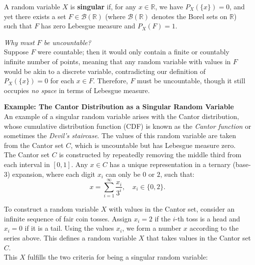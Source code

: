 \begin{definition}
    A random variable \( X \) is \textbf{singular} if, for any \( x \in \mathbb{R} \), we have \( P_X(\{x\}) = 0 \), and yet there exists a set \( F \in \mathcal{B}(\mathbb{R}) \) (where \( \mathcal{B}(\mathbb{R}) \) denotes the Borel sets on \( \mathbb{R} \)) such that \( F \) has zero Lebesgue measure and \( P_X(F) = 1 \).
\end{definition}

\textit{Why must \( F \) be uncountable?} \\

Suppose \( F \) were countable; then it would only contain a finite or countably infinite number of points, meaning that any random variable with values in \( F \) would be akin to a discrete variable, contradicting our definition of \( P_X(\{x\}) = 0 \) for each \( x \in F \). Therefore, \( F \) must be uncountable, though it still occupies \textit{no space} in terms of Lebesgue measure. \newpage

\textbf{Example: The Cantor Distribution as a Singular Random Variable}\\

An example of a singular random variable arises with the Cantor distribution, whose cumulative distribution function (CDF) is known as the \textit{Cantor function} or sometimes the \textit{Devil's staircase}. The values of this random variable are taken from the Cantor set \( C \), which is uncountable but has Lebesgue measure zero.\\

The Cantor set \( C \) is constructed by repeatedly removing the middle third from each interval in \( [0, 1] \). Any \( x \in C \) has a unique representation in a ternary (base-3) expansion, where each digit \( x_i \) can only be \( 0 \) or \( 2 \), such that:
\[
x = \sum_{i=1}^{\infty} \frac{x_i}{3^i}, \quad x_i \in \{0, 2\}.
\]

To construct a random variable \( X \) with values in the Cantor set, consider an infinite sequence of fair coin tosses. Assign \( x_i = 2 \) if the \( i \)-th toss is a head and \( x_i = 0 \) if it is a tail. Using the values \( x_i \), we form a number \( x \) according to the series above. This defines a random variable \( X \) that takes values in the Cantor set \( C \).\\

This \( X \) fulfills the two criteria for being a singular random variable:\\

